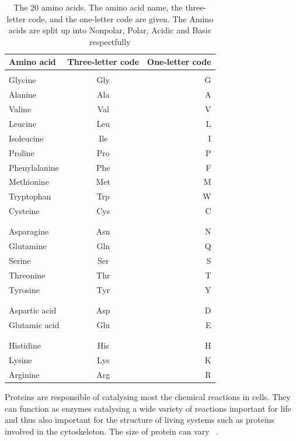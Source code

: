 \documentclass{report}
\begin{document}
\begin{table}[h!]
    \begin{center}
    \label{tab:Amino acids}
        \begin{tabular}{l|c|r}
        Amino acid & Three-letter code & One-letter code\\
        \hline
        \\
        Glycine & Gly & G\\
        Alanine & Ala & A\\
        Valine & Val & V\\
        Leucine & Leu & L\\
        Isoleucine & Ile & I\\
        Proline & Pro & P\\
        Phenylalanine & Phe & F\\
        Methionine & Met & M\\
        Tryptophan & Trp & W\\
        Cysteine & Cys & C\\
        \\
        \hline
        \\
        Asparagine & Asn & N\\
        Glutamine & Gln & Q\\
        Serine & Ser & S\\
        Threonine & Thr & T\\
        Tyrosine & Tyr & Y\\
        \\
        \hline
        \\
        Aspartic acid & Asp & D\\
        Glutamic acid & Glu & E\\
        \\
        \hline
        \\
        Histidine & His & H\\
        Lysine & Lys & K\\
        Arginine & Arg & R\\
        \end{tabular}
        \caption{\label{Amino acids}The 20 amino acids. The amino acid name, the three-letter code, and the one-letter code are given. The Amino acids are split up into Nonpolar, Polar, Acidic and Basic respectfully}
    \end{center}
\end{table}

Proteins are responsible of catalysing most the chemical reactions in cells. They can function as enzymes catalysing a wide variety of reactions important for life and thus also important for the structure of living systems such as proteins involved in the cytoskeleton. The size of protein can vary ~\cite{zvelebil_understanding_2008}.
\end{document}
